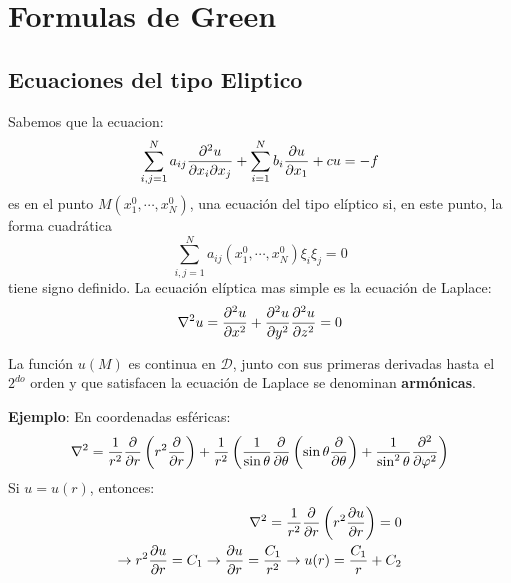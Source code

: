 \documentclass[../main]{subfiles}
\begin{document}
\section{Formulas de Green}
\subsection{Ecuaciones del tipo Eliptico}
Sabemos que la ecuacion:
\begin{equation}
    \sum_{i,j=1}^N a_{ij} \pdv{^2 u}{x_i \partial x_j}+\sum_{i=1}^N b_i \pdv{u}{x_1}+cu=-f
\end{equation}
es en el punto $M(x_1^0, \cdots , x_N^0)$, una ecuación del tipo elíptico si, en este punto, la forma cuadrática
\begin{equation}
    \sum_{i,j=1}^N a_{ij} (x_1^0, \cdots, x_N^0) \xi_i \xi_j=0
\end{equation}
tiene signo definido. La ecuación elíptica mas simple es la ecuación de Laplace:
\begin{equation}
    \nabla^2 u= \pdv{^2 u}{x^2}+\pdv{^2 u}{y^2}\pdv{^2 u}{z^2}=0
\end{equation}
\begin{definicion}
    La función $u(M)$ es continua en $\mathcal{D}$, junto con sus primeras derivadas hasta el $2^{do}$ orden y que satisfacen la ecuación de Laplace se denominan \textbf{armónicas}.
\end{definicion}
\textbf{Ejemplo}: En coordenadas esféricas:
\begin{equation}
    \nabla^2 = \dfrac{1}{r^2} \pdv{}{r}\left( r^2 \pdv{}{r}\right)+\dfrac{1}{r^2}\left( \dfrac{1}{\sin{\theta}}\pdv{}{\theta}\left( \sin{\theta} \pdv{}{\theta}\right)+\dfrac{1}{\sin^2{\theta}} \pdv{^2}{\varphi^2}\right)
\end{equation}
Si $u=u(r)$, entonces:
\begin{align}
    \nabla^2 = \dfrac{1}{r^2} \pdv{}{r}\left( r^2 \pdv{u}{r}\right)=0 \\
    \rightarrow r^2 \pdv{u}{r}=C_1 \rightarrow \pdv{u}{r}=\dfrac{C_1}{r^2} \rightarrow u(r)=\dfrac{C_1}{r}+C_2
\end{align}
\end{document}
